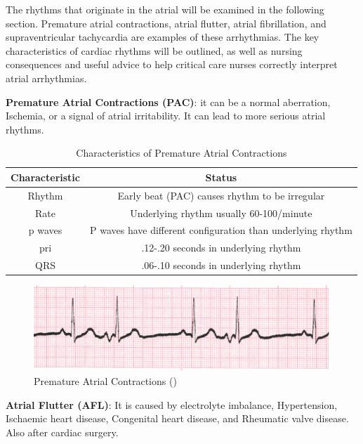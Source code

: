 The rhythms that originate in the atrial will be examined in the following section. Premature atrial contractions, atrial flutter, atrial fibrillation, and supraventricular tachycardia are examples of these arrhythmias. The key characteristics of cardiac rhythms will be outlined, as well as nursing consequences and useful advice to help critical care nurses correctly interpret atrial arrhythmias.

\textbf{Premature Atrial Contractions (PAC)}: it can be a normal aberration,
Ischemia,  or a signal of atrial irritability. It can lead to more serious atrial rhythms.

\begin{table}[H]
\begin{center}
\begin{tabular}{||c || c||}
 \hline
\textbf{Characteristic} & \textbf{Status} \\ [0.4ex] 
 \hline\hline
 Rhythm & Early beat (PAC) causes rhythm to be irregular \\
\hline
Rate & Underlying rhythm usually 60-100/minute\\
\hline
p waves & P waves have different configuration than underlying rhythm \\
\hline
pri & .12-.20 seconds in underlying rhythm \\
\hline
QRS & .06-.10 seconds in underlying rhythm \\
\hline\hline
\end{tabular}
\end{center}
\caption{Characteristics of Premature Atrial Contractions}
\label{table:PAC_characteristics}
\end{table}

 \begin{figure}[H]
\centering
\includegraphics[scale=0.9]{img/PAC.png}
\caption{Premature Atrial Contractions (\cite{arryth_types})}
\label{fig:PAC}
\end{figure}

\textbf{Atrial Flutter (AFL)}: It is caused by electrolyte imbalance, Hypertension, Ischaemic heart disease, Congenital heart disease, and Rheumatic valve disease. Also after cardiac surgery.

